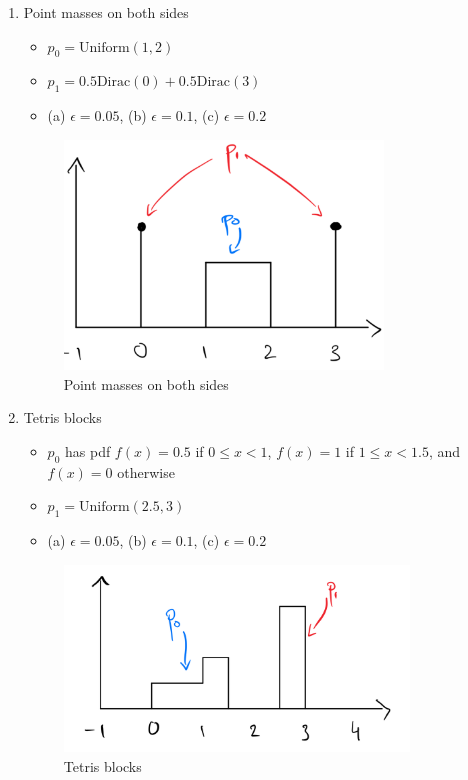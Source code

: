 \documentclass[11pt]{article}
\begin{document}
\begin{enumerate}
\item Point masses on both sides 
	\begin{itemize}
		\item $p_0 = \text{Uniform}(1,2)$ 
		\item $p_1 = 0.5 \text{Dirac}(0) + 0.5 \text{Dirac}(3)$
		\item (a) $\epsilon = 0.05$, (b) $\epsilon = 0.1$, (c) $\epsilon = 0.2$
	\end{itemize}

\begin{center}
	\begin{figure}[h!]
	\includegraphics[width=240pt]{3.png}
	\caption{Point masses on both sides}
	\end{figure}
\end{center}


\item Tetris blocks
	\begin{itemize}
		\item $p_0$ has pdf $f(x) = 0.5$ if $0 \leq x < 1$, $f(x) = 1$ if $1 \leq x < 1.5$, and $f(x) = 0$ otherwise
	\item $p_1 = \text{Uniform}(2.5, 3)$
		\item (a) $\epsilon = 0.05$, (b) $\epsilon = 0.1$, (c) $\epsilon = 0.2$
	\end{itemize}

\begin{center}
	\begin{figure}[h!]
	\includegraphics[width=260pt]{4.png}
	\caption{Tetris blocks}
	\end{figure}
\end{center}

\end{enumerate}
\end{document}
